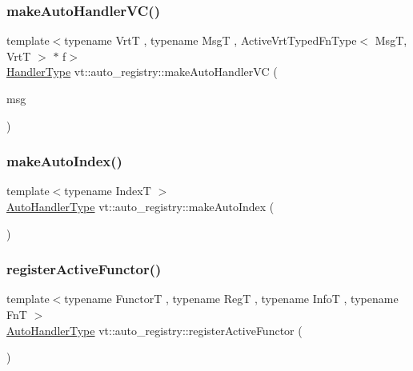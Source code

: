 \subsubsection{\texorpdfstring{make\+Auto\+Handler\+V\+C()}{makeAutoHandlerVC()}\hspace{0.1cm}{\footnotesize\ttfamily [2/2]}}
{\footnotesize\ttfamily template$<$typename VrtT , typename MsgT , Active\+Vrt\+Typed\+Fn\+Type$<$ Msg\+T, Vrt\+T $>$ $\ast$ f$>$ \\
\hyperlink{namespacevt_af64846b57dfcaf104da3ef6967917573}{Handler\+Type} vt\+::auto\+\_\+registry\+::make\+Auto\+Handler\+VC (\begin{DoxyParamCaption}\item[{MsgT $\ast$const}]{msg }\end{DoxyParamCaption})}

\mbox{\label{namespacevt_1_1auto__registry_a14e79eb6744c7f1584d46304356295e2}} 
\subsubsection{\texorpdfstring{make\+Auto\+Index()}{makeAutoIndex()}}
{\footnotesize\ttfamily template$<$typename IndexT $>$ \\
\hyperlink{namespacevt_1_1auto__registry_ae295e18699146815bb7d7674594d95d7}{Auto\+Handler\+Type} vt\+::auto\+\_\+registry\+::make\+Auto\+Index (\begin{DoxyParamCaption}{ }\end{DoxyParamCaption})\hspace{0.3cm}{\ttfamily [inline]}}

\mbox{\label{namespacevt_1_1auto__registry_ab7e130e8790e4df4dc1d35476d1736e0}} 
\subsubsection{\texorpdfstring{register\+Active\+Functor()}{registerActiveFunctor()}}
{\footnotesize\ttfamily template$<$typename FunctorT , typename RegT , typename InfoT , typename FnT $>$ \\
\hyperlink{namespacevt_1_1auto__registry_ae295e18699146815bb7d7674594d95d7}{Auto\+Handler\+Type} vt\+::auto\+\_\+registry\+::register\+Active\+Functor (\begin{DoxyParamCaption}{ }\end{DoxyParamCaption})}

